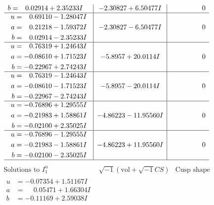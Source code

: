 \documentclass[1p]{elsarticle_modified}
\theoremstyle{definition}
\newcommand{\I}{\sqrt{-1}}
\begin{document}
$$\begin{array}{c|c|c}
\begin{aligned}
b &= \phantom{-}0.02914 + 2.35233 I\end{aligned}
 & -2.30827 + 6.50477 I & \phantom{-0.000000 } 0 \\ \hline\begin{aligned}
u &= \phantom{-}0.69110 - 1.28047 I \\
a &= \phantom{-}0.21218 - 1.59372 I \\
b &= \phantom{-}0.02914 - 2.35233 I\end{aligned}
 & -2.30827 - 6.50477 I & \phantom{-0.000000 } 0 \\ \hline\begin{aligned}
u &= \phantom{-}0.76319 + 1.24643 I \\
a &= -0.08610 + 1.71523 I \\
b &= -0.22967 + 2.74243 I\end{aligned}
 & -5.8957 + 20.0114 I & \phantom{-0.000000 } 0 \\ \hline\begin{aligned}
u &= \phantom{-}0.76319 - 1.24643 I \\
a &= -0.08610 - 1.71523 I \\
b &= -0.22967 - 2.74243 I\end{aligned}
 & -5.8957 - 20.0114 I & \phantom{-0.000000 } 0 \\ \hline\begin{aligned}
u &= -0.76896 + 1.29555 I \\
a &= -0.21983 + 1.58861 I \\
b &= -0.02100 + 2.35025 I\end{aligned}
 & -4.86223 - 11.95560 I & \phantom{-0.000000 } 0 \\ \hline\begin{aligned}
u &= -0.76896 - 1.29555 I \\
a &= -0.21983 - 1.58861 I \\
b &= -0.02100 - 2.35025 I\end{aligned}
 & -4.86223 + 11.95560 I & \phantom{-0.000000 } 0\\
 \hline 
 \end{array}$$\newpage$$\begin{array}{c|c|c}  
\text{Solutions to }I^u_{1}& \I (\text{vol} + \sqrt{-1}CS) & \text{Cusp shape}\\
 \hline 
\begin{aligned}
u &= -0.07354 + 1.51167 I \\
a &= \phantom{-}0.05471 + 1.66304 I \\
b &= -0.11169 + 2.59038 I\end{aligned}

\end{array}$$
\end{document}
